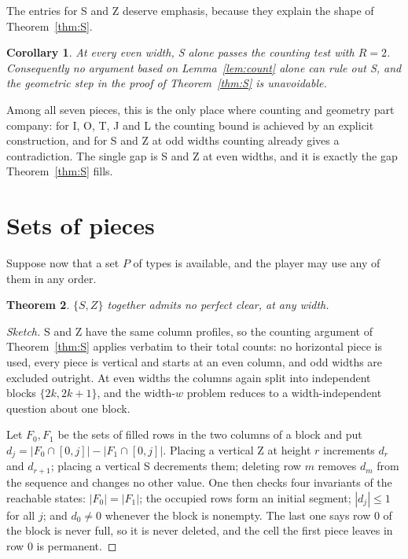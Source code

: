 \documentclass[11pt,a4paper]{article}
\theoremstyle{plain}
\newtheorem{theorem}{Theorem}
\newtheorem{corollary}[theorem]{Corollary}
\theoremstyle{definition}
\theoremstyle{remark}
\begin{document}
The entries for S and Z deserve emphasis, because they explain the shape of
Theorem~\ref{thm:S}.

\begin{corollary}
\label{cor:geometry}
At every even width, S alone passes the counting test with $R = 2$. Consequently no
argument based on Lemma~\ref{lem:count} alone can rule out S, and the geometric step
in the proof of Theorem~\ref{thm:S} is unavoidable.
\end{corollary}

Among all seven pieces, this is the only place where counting and geometry part
company: for I, O, T, J and L the counting bound is achieved by an explicit
construction, and for S and Z at odd widths counting already gives a contradiction.
The single gap is S and Z at even widths, and it is exactly the gap
Theorem~\ref{thm:S} fills.

\section{Sets of pieces}

Suppose now that a set $P$ of types is available, and the player may use any of them
in any order.

\begin{theorem}
\label{thm:SZ}
$\{S,Z\}$ together admits no perfect clear, at any width.
\end{theorem}

\begin{proof}[Sketch]
S and Z have the same column profiles, so the counting argument of
Theorem~\ref{thm:S} applies verbatim to their total counts: no horizontal piece is
used, every piece is vertical and starts at an even column, and odd widths are
excluded outright. At even widths the columns again split into independent blocks
$\{2k,2k+1\}$, and the width-$w$ problem reduces to a width-independent question
about one block.

Let $F_0, F_1$ be the sets of filled rows in the two columns of a block and put
$d_j = |F_0 \cap [0,j]| - |F_1 \cap [0,j]|$. Placing a vertical Z at height $r$
increments $d_r$ and $d_{r+1}$; placing a vertical S decrements them; deleting row
$m$ removes $d_m$ from the sequence and changes no other value. One then checks four
invariants of the reachable states: $|F_0| = |F_1|$; the occupied rows form an
initial segment; $|d_j| \leq 1$ for all $j$; and $d_0 \neq 0$ whenever the block is
nonempty. The last one says row $0$ of the block is never full, so it is never
deleted, and the cell the first piece leaves in row $0$ is permanent.
\end{proof}
\end{document}
